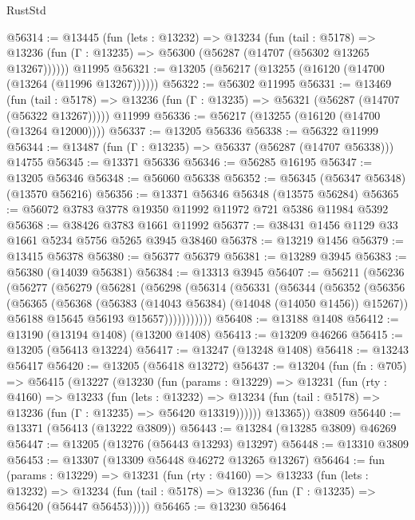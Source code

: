 \begin{lexlean}{RustStd}
\begin{coremodule}
@56314 := @13445
    (fun (lets : @13232) =>
    @13234
      (fun (tail : @5178) =>
      @13236 (fun (Γ : @13235) => @56300 (@56287 (@14707 (@56302 @13265 @13267))))))
    @11995
@56321 := @13205 (@56217 (@13255 (@16120 (@14700 (@13264 (@11996 @13267))))))
@56322 := @56302 @11995
@56331 := @13469
    (fun (tail : @5178) => @13236 (fun (Γ : @13235) => @56321 (@56287 (@14707 (@56322 @13267)))))
    @11999
@56336 := @56217 (@13255 (@16120 (@14700 (@13264 @12000))))
@56337 := @13205 @56336
@56338 := @56322 @11999
@56344 := @13487 (fun (Γ : @13235) => @56337 (@56287 (@14707 @56338))) @14755
@56345 := @13371 @56336
@56346 := @56285 @16195
@56347 := @13205 @56346
@56348 := @56060 @56338
@56352 := @56345 (@56347 @56348) (@13570 @56216)
@56356 := @13371 @56346 @56348 (@13575 @56284)
@56365 := @56072 @3783 @3778 @19350 @11992 @11972 @721 @5386 @11984 @5392
@56368 := @38426 @3783 @1661 @11992
@56377 := @38431 @1456 @1129 @33 @1661 @5234 @5756 @5265 @3945 @38460
@56378 := @13219 @1456
@56379 := @13415 @56378
@56380 := @56377 @56379
@56381 := @13289 @3945
@56383 := @56380 (@14039 @56381)
@56384 := @13313 @3945
@56407 := @56211
    (@56236
      (@56277
        (@56279
          (@56281
            (@56298
              (@56314
                (@56331
                  (@56344
                    (@56352
                      (@56356
                        (@56365
                          (@56368 (@56383 (@14043 @56384) (@14048 (@14050 @1456)) @15267))
                          @56188
                          @15645
                          @56193
                          @15657)))))))))))
@56408 := @13188 @1408
@56412 := @13190 (@13194 @1408) (@13200 @1408)
@56413 := @13209 @46266
@56415 := @13205 (@56413 @13224)
@56417 := @13247 (@13248 @1408)
@56418 := @13243 @56417
@56420 := @13205 (@56418 @13272)
@56437 := @13204
    (fun (fn : @705) =>
    @56415
      (@13227
        (@13230
          (fun (params : @13229) =>
          @13231
            (fun (rty : @4160) =>
            @13233
              (fun (lets : @13232) =>
              @13234 (fun (tail : @5178) => @13236 (fun (Γ : @13235) => @56420 @13319))))))
        @13365))
    @3809
@56440 := @13371 (@56413 (@13222 @3809))
@56443 := @13284 (@13285 @3809) @46269
@56447 := @13205 (@13276 (@56443 @13293) @13297)
@56448 := @13310 @3809
@56453 := @13307 (@13309 @56448 @46272 @13265 @13267)
@56464 := fun (params : @13229) =>
  @13231
    (fun (rty : @4160) =>
    @13233
      (fun (lets : @13232) =>
      @13234 (fun (tail : @5178) => @13236 (fun (Γ : @13235) => @56420 (@56447 @56453)))))
@56465 := @13230 @56464

\end{coremodule}
\end{lexlean}
